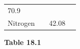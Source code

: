\begin{enumerate}[noitemsep, label=\textbf{\arabic*}. ]
{\begin{center}
\begin{xtabular*}{\mytablewidth}[t]{|p{10\mystarwidth}|p{10\mystarwidth}|p{10\mystarwidth}|p{10\mystarwidth}|}
    
        70.9 &
    
    
     \tabularnewline{}
    
    
        Nitrogen &
    
    
         &
    
    
        42.08 &
    
    
     \tabularnewline{}
    \end{xtabular*}
      \end{center}
    \begin{center}{\small\bfseries Table 18.1}\end{center}
    
    \addtocounter{footnote}{-0}
    
        }%
      

\end{enumerate}
